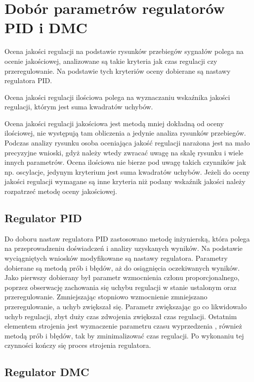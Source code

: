 \section{Dobór parametrów regulatorów PID i DMC}
Ocena jakości regulacji na podstawie rysunków przebiegów sygnałów polega na ocenie jakościowej, analizowane są takie kryteria jak czas regulacji czy przeregulowanie. Na podstawie tych kryteriów oceny dobierane są nastawy regulatora PID.

Ocena jakości regulacji ilościowa polega na wyznaczaniu wskaźnika jakości regulacji, którym jest suma kwadratów uchybów. 

Ocena jakości regulacji jakościowa jest metodą mniej dokładną od oceny ilościowej, nie występują tam obliczenia a jedynie analiza rysunków przebiegów. Podczas analizy rysunku osoba oceniająca jakość regulacji narażona jest na mało precyzyjne wnioski, gdyż należy wtedy zwracać uwagę na skalę rysunku i wiele innych parametrów. Ocena ilościowa nie bierze pod uwagę takich czynników jak np. oscylacje, jedynym kryterium jest suma kwadratów uchybów. Jeżeli do oceny jakości regulacji wymagane są inne kryteria niż podany wskaźnik jakości należy rozpatrzeć metodę oceny jakościowej.

\subsection{Regulator PID}

Do doboru nastaw regulatora PID zastosowano metodę inżynierską, 
która polega na przeprowadzeniu doświadczeń i analizy uzyskanych wyników. 
Na podstawie wyciągniętych wniosków modyfikowane są nastawy regulatora. 
Parametry  dobierane są metodą prób i błędów, aż do osiągnięcia oczekiwanych wyników. 
Jako pierwszy dobierany był parametr wzmocnienia członu proporcjonalnego, 
poprzez obserwację zachowania się uchybu regulacji w stanie ustalonym oraz przeregulowanie. 
Zmniejszając stopniowo wzmocnienie zmniejszano przeregulowanie, a uchyb zwiększał się. 
Parametr  zwiększając go co likwidowało uchyb regulacji,  
zbyt duży czas zdwojenia zwiększał czas regulacji. 
Ostatnim elementem strojenia jest wyznaczenie parametru czasu wyprzedzenia , 
również metodą prób i błędów, tak by zminimalizować czas regulacji. 
Po wykonaniu tej czynności kończy się proces strojenia regulatora.

\subsection{Regulator DMC}

